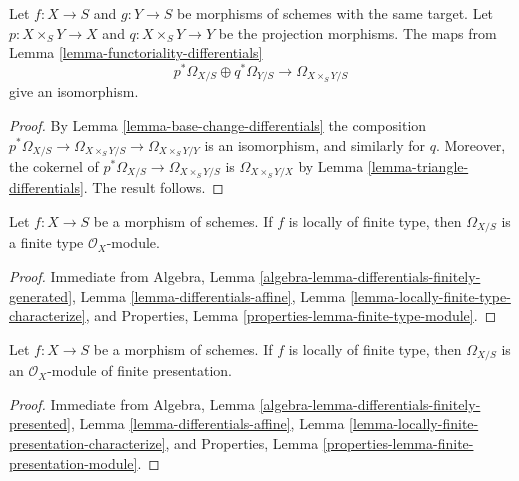 \begin{lemma}
\label{lemma-differential-product}
Let $f : X \to S$ and $g : Y \to S$ be morphisms of schemes with the same
target. Let $p : X \times_S Y \to X$ and $q : X \times_S Y \to Y$ be the
projection morphisms. The maps from
Lemma \ref{lemma-functoriality-differentials}
$$
p^*\Omega_{X/S} \oplus q^*\Omega_{Y/S}
\longrightarrow
\Omega_{X \times_S Y/S}
$$
give an isomorphism.
\end{lemma}

\begin{proof}
By Lemma \ref{lemma-base-change-differentials} the composition
$p^*\Omega_{X/S} \to \Omega_{X \times_S Y/S} \to \Omega_{X \times_S Y/Y}$
is an isomorphism, and similarly for $q$. Moreover, the cokernel
of $p^*\Omega_{X/S} \to \Omega_{X \times_S Y/S}$ is
$\Omega_{X \times_S Y/X}$ by
Lemma \ref{lemma-triangle-differentials}. The result follows.
\end{proof}





\begin{lemma}
\label{lemma-finite-type-differentials}
Let $f : X \to S$ be a morphism of schemes.
If $f$ is locally of finite type, then $\Omega_{X/S}$ is
a finite type $\mathcal{O}_X$-module.
\end{lemma}

\begin{proof}
Immediate from
Algebra, Lemma \ref{algebra-lemma-differentials-finitely-generated},
Lemma \ref{lemma-differentials-affine},
Lemma \ref{lemma-locally-finite-type-characterize}, and
Properties, Lemma \ref{properties-lemma-finite-type-module}.
\end{proof}

\begin{lemma}
\label{lemma-finite-presentation-differentials}
Let $f : X \to S$ be a morphism of schemes.
If $f$ is locally of finite type, then $\Omega_{X/S}$ is
an $\mathcal{O}_X$-module of finite presentation.
\end{lemma}

\begin{proof}
Immediate from
Algebra, Lemma \ref{algebra-lemma-differentials-finitely-presented},
Lemma \ref{lemma-differentials-affine},
Lemma \ref{lemma-locally-finite-presentation-characterize}, and
Properties, Lemma \ref{properties-lemma-finite-presentation-module}.
\end{proof}










